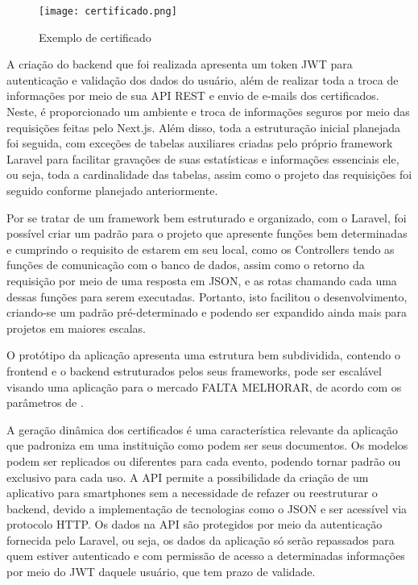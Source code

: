 \begin{figure}[H]
    \caption{\label{certificado}Exemplo de certificado}
    \vspace{5pt}
    \centering
    \texttt{[image: certificado.png]}
    \vspace{5pt}
\end{figure}

A criação do backend que foi realizada apresenta um token JWT para autenticação e validação dos dados do usuário, além de realizar toda a troca de informações por meio de sua API REST e envio de e-mails dos certificados. Neste, é proporcionado um ambiente e troca de informações seguros por meio das requisições feitas pelo Next.js. Além disso, toda a estruturação inicial planejada foi seguida, com exceções de tabelas auxiliares criadas pelo próprio framework Laravel para facilitar gravações de suas estatísticas e informações essenciais ele, ou seja, toda a cardinalidade das tabelas, assim como o projeto das requisições foi seguido conforme planejado anteriormente.

Por se tratar de um framework bem estruturado e organizado, com o Laravel, foi possível criar um padrão para o projeto que apresente funções bem determinadas e cumprindo o requisito de estarem em seu local, como os Controllers tendo as funções de comunicação com o banco de dados, assim como o retorno da requisição por meio de uma resposta em JSON, e as rotas chamando cada uma dessas funções para serem executadas. Portanto, isto facilitou o desenvolvimento, criando-se um padrão pré-determinado e podendo ser expandido ainda mais para projetos em maiores escalas.

O protótipo da aplicação apresenta uma estrutura bem subdividida, contendo o frontend e o backend estruturados pelos seus frameworks, pode ser escalável visando uma aplicação para o mercado FALTA MELHORAR, de acordo com os parâmetros de .

A geração dinâmica dos certificados é uma característica relevante da aplicação que padroniza em uma instituição como podem ser seus documentos. Os modelos podem ser replicados ou diferentes para cada evento, podendo tornar padrão ou exclusivo para cada uso. A API permite a possibilidade da criação de um aplicativo para smartphones sem a necessidade de refazer ou reestruturar o backend, devido a implementação de tecnologias como o JSON e ser acessível via protocolo HTTP. Os dados na API são protegidos por meio da autenticação fornecida pelo Laravel, ou seja, os dados da aplicação só serão repassados para quem estiver autenticado e com permissão de acesso a determinadas informações por meio do JWT daquele usuário, que tem prazo de validade. 

